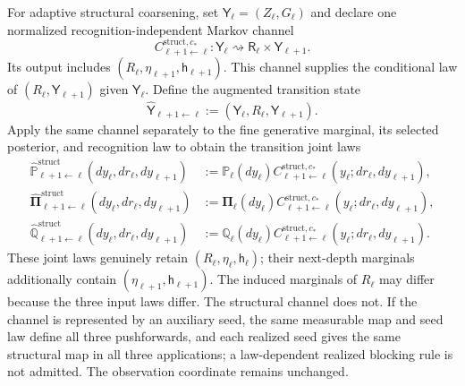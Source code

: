 For adaptive structural coarsening, set $\mathsf Y_\ell=(Z_\ell,G_\ell)$ and
declare one normalized recognition-independent Markov channel
\begin{equation}
C^{\mathrm{struct},c_*}_{\ell+1\leftarrow\ell}:
\mathsf Y_\ell\rightsquigarrow
\mathsf R_\ell\times\mathsf Y_{\ell+1}.
\label{eq:full-graph-common-structural-channel}
\end{equation}
Its output includes $(R_\ell,\eta_{\ell+1},\mathsf h_{\ell+1})$. This channel
supplies the conditional law of $(R_\ell,\mathsf Y_{\ell+1})$ given
$\mathsf Y_\ell$. Define the augmented transition state
\begin{equation}
\widehat{\mathsf Y}_{\ell+1\leftarrow\ell}
:=(\mathsf Y_\ell,R_\ell,\mathsf Y_{\ell+1}).
\label{eq:full-graph-augmented-transition-state}
\end{equation}
Apply the same channel separately to the fine generative marginal, its
selected posterior, and recognition law to obtain the transition joint laws
\begin{align}
\widehat{\mathbb P}^{\mathrm{struct}}_{\ell+1\leftarrow\ell}
(dy_\ell,dr_\ell,dy_{\ell+1})
&:=\mathbb P_\ell(dy_\ell)
C^{\mathrm{struct},c_*}_{\ell+1\leftarrow\ell}
(y_\ell;dr_\ell,dy_{\ell+1}),
\nonumber\\
\widehat{\boldsymbol\Pi}^{\mathrm{struct}}_{\ell+1\leftarrow\ell}
(dy_\ell,dr_\ell,dy_{\ell+1})
&:=\boldsymbol\Pi_\ell(dy_\ell)
C^{\mathrm{struct},c_*}_{\ell+1\leftarrow\ell}
(y_\ell;dr_\ell,dy_{\ell+1}),
\nonumber\\
\widehat{\mathbb Q}^{\mathrm{struct}}_{\ell+1\leftarrow\ell}
(dy_\ell,dr_\ell,dy_{\ell+1})
&:=\mathbb Q_\ell(dy_\ell)
C^{\mathrm{struct},c_*}_{\ell+1\leftarrow\ell}
(y_\ell;dr_\ell,dy_{\ell+1}).
\label{eq:full-graph-common-structural-pushforwards}
\end{align}
These joint laws genuinely retain $(R_\ell,\eta_\ell,\mathsf h_\ell)$; their
next-depth marginals additionally contain
$(\eta_{\ell+1},\mathsf h_{\ell+1})$.
The induced marginals of $R_\ell$ may differ because the three input laws
differ. The structural channel does not. If the channel is represented by an
auxiliary seed, the same measurable map and seed law define all three
pushforwards, and each realized seed gives the same structural map in all three
applications; a law-dependent realized blocking rule is not admitted. The
observation coordinate remains unchanged. 

